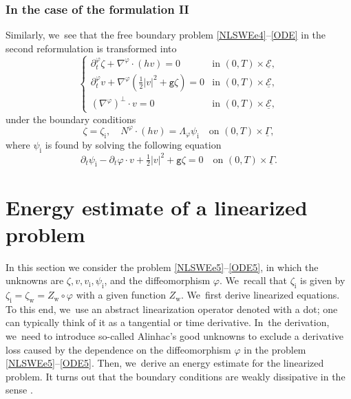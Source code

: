 \documentclass[10pt]{amsart}
\newcommand{\gr}{{\mathtt g}}
\newcommand{\dt}{\partial_t}
\newcommand{\cE}{{\mathcal E}}
\newcommand{\ul}[1]{\underline{#1}}
\newcommand{\itGamma}{\mathit{\Gamma}}
\theoremstyle{definition}
\begin{document}
\subsubsection{In the case of the formulation II}
Similarly, we~see that the free boundary problem \eqref{NLSWEe4}--\eqref{ODE} in the second reformulation is transformed into
\begin{equation}\label{NLSWEe5}
\begin{cases}
\dt^\varphi\zeta+\nabla^\varphi\cdot(hv) = 0 &\text{in } (0,T)\times\ul{\cE}, \\
\dt^\varphi v+\nabla^\varphi(\frac12|v|^2+\gr\zeta) = 0 &\text{in } (0,T)\times\ul{\cE}, \\
(\nabla^\varphi)^\perp\cdot v = 0 &\text{in } (0,T)\times\ul{\cE},
\end{cases}
\end{equation}
under the boundary conditions
\begin{equation}\label{BC5}
\zeta=\zeta_\mathrm{i}, \quad N^\varphi\cdot (h v) = \Lambda_\varphi \psi_\mathrm{i} \quad\text{on } (0,T)\times\ul{\itGamma},
\end{equation}
where $\psi_\mathrm{i}$ is found by solving the following equation
\begin{equation}\label{ODE5}
\dt \psi_\mathrm{i} -\dt \varphi\cdot v + \tfrac12|v|^2+\gr\zeta = 0 \quad\text{on } (0,T)\times\ul{\itGamma}.
\end{equation}

\section{Energy estimate of a linearized problem}\label{sect:EE}
In this section we consider the problem \eqref{NLSWEe5}--\eqref{ODE5}, in which the unknowns are $\zeta,v,v_\mathrm{i}, \psi_\mathrm{i}$, and the diffeomorphism $\varphi$. We~recall that $\zeta_\mathrm{i}$ is given by $\zeta_\mathrm{i}=\zeta_\mathrm{w}=Z_\mathrm{w}\circ\varphi$ with a given function $Z_\mathrm{w}$. We~first derive linearized equations.
To this end, we~use an abstract linearization operator denoted with a dot; one can typically think of it as a tangential or time derivative. In~the derivation, we~need to introduce so-called Alinhac's good unknowns to exclude a derivative loss caused by the dependence on the diffeomorphism $\varphi$
in the problem \eqref{NLSWEe5}--\eqref{ODE5}.
Then, we~derive an energy estimate for the linearized problem.
It turns out that the boundary conditions are weakly dissipative in the sense \cite{IguchiLannes2023}.
\end{document}
